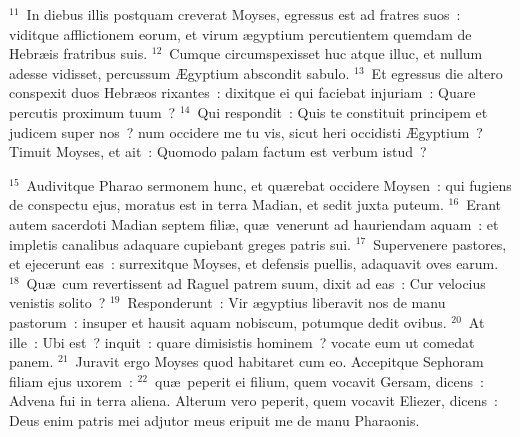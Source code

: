 ${}^{11}$~In diebus illis postquam creverat Moyses, egressus est ad fratres suos~: viditque afflictionem eorum, et virum \ae gyptium percutientem quemdam de Hebr\ae is fratribus suis.
${}^{12}$~Cumque circumspexisset huc atque illuc, et nullum adesse vidisset, percussum \AE gyptium abscondit sabulo.
${}^{13}$~Et egressus die altero conspexit duos Hebr\ae os rixantes~: dixitque ei qui faciebat injuriam~: Quare percutis proximum tuum~?
${}^{14}$~Qui respondit~: Quis te constituit principem et judicem super nos~? num occidere me tu vis, sicut heri occidisti \AE gyptium~? Timuit Moyses, et ait~: Quomodo palam factum est verbum istud~?


${}^{15}$~Audivitque Pharao sermonem hunc, et qu\ae rebat occidere Moysen~: qui fugiens de conspectu ejus, moratus est in terra Madian, et sedit juxta puteum.
${}^{16}$~Erant autem sacerdoti Madian septem fili\ae , qu\ae\ venerunt ad hauriendam aquam~: et impletis canalibus adaquare cupiebant greges patris sui.
${}^{17}$~Supervenere pastores, et ejecerunt eas~: surrexitque Moyses, et defensis puellis, adaquavit oves earum.
${}^{18}$~Qu\ae\ cum revertissent ad Raguel patrem suum, dixit ad eas~: Cur velocius venistis solito~?
${}^{19}$~Responderunt~: Vir \ae gyptius liberavit nos de manu pastorum~: insuper et hausit aquam nobiscum, potumque dedit ovibus.
${}^{20}$~At ille~: Ubi est~? inquit~: quare dimisistis hominem~? vocate eum ut comedat panem.
${}^{21}$~Juravit ergo Moyses quod habitaret cum eo. Accepitque Sephoram filiam ejus uxorem~:
${}^{22}$~qu\ae\ peperit ei filium, quem vocavit Gersam, dicens~: Advena fui in terra aliena. Alterum vero peperit, quem vocavit Eliezer, dicens~: Deus enim patris mei adjutor meus eripuit me de manu Pharaonis.


